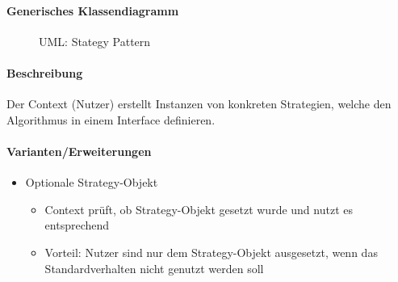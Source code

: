 			\paragraph{Generisches Klassendiagramm}
				\begin{figure}[ht]
					\centering
					\caption{UML: Stategy Pattern}
				\end{figure}

			\paragraph{Beschreibung}
				Der Context (Nutzer) erstellt Instanzen von konkreten Strategien, welche den Algorithmus in einem Interface definieren.

			\paragraph{Varianten/Erweiterungen}
				\begin{itemize}
					\item Optionale Strategy-Objekt
						\begin{itemize}
							\item Context prüft, ob Strategy-Objekt gesetzt wurde und nutzt es entsprechend
							\item Vorteil: Nutzer sind nur dem Strategy-Objekt ausgesetzt, wenn das Standardverhalten nicht genutzt werden soll
						\end{itemize}
				\end{itemize}

